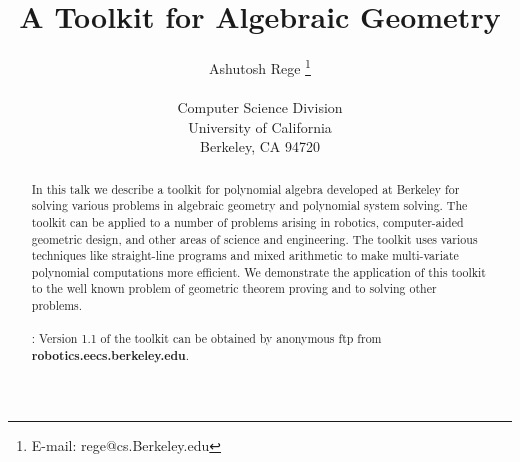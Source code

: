 
\textwidth 6.5in
\textheight 7.5in
\evensidemargin=-0.1in
\oddsidemargin=-0.1in
\topmargin -0.7in



\pagestyle{empty}


\title{A Toolkit for Algebraic Geometry}

\author{Ashutosh Rege \thanks{ E-mail: rege@cs.Berkeley.edu} \\ \\
Computer Science Division \\
University of California\\
Berkeley, CA 94720}
\date{}

\maketitle
\thispagestyle{empty}


\begin{abstract}
In this talk we describe a toolkit for polynomial algebra 
developed at Berkeley for solving various problems in algebraic
geometry and polynomial system solving. 
The toolkit can be applied to a number of problems arising in robotics,
computer-aided geometric design,  and other areas of science and 
engineering. 
The toolkit uses various techniques like straight-line programs
and mixed arithmetic to make multi-variate polynomial computations
more efficient.
We demonstrate the application of this toolkit to the
well known problem of geometric theorem proving and
to solving other problems.  
\\ \\
 : Version 1.1
of the toolkit can be obtained by anonymous ftp from 
{\bf robotics.eecs.berkeley.edu}. 
\end{abstract}


